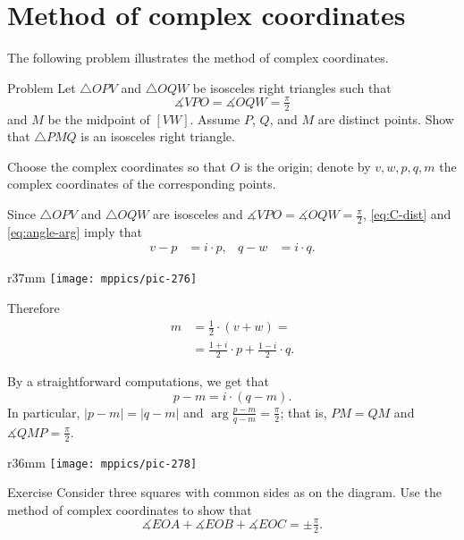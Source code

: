 \section*{Method of complex coordinates}

The following problem illustrates the method of complex coordinates.

\begin{thm}{Problem}\label{prob:2right-tringles}
Let $\triangle OPV$ and $\triangle OQW$ be isosceles right triangles such that 
\[\measuredangle VPO=\measuredangle OQW=\tfrac\pi2\] 
and $M$ be the midpoint of $[VW]$.
Assume $P$, $Q$, and $M$ are distinct points.
Show that  $\triangle PMQ$ is an isosceles right triangle.
\end{thm}

Choose the complex coordinates so that $O$ is the origin;
denote by $v, w, p, q, m$ the complex coordinates of the corresponding points.

Since $\triangle OPV$ and $\triangle OQW$ are isosceles and $\measuredangle VPO=\measuredangle OQW=\tfrac\pi2$,
\ref{eq:C-dist} and \ref{eq:angle-arg} imply that
\begin{align*}
v-p&=i\cdot p,
&
q-w&=i\cdot q.
\end{align*}

\begin{wrapfigure}{r}{37mm}
\centering
\texttt{[image: mppics/pic-276]}
\end{wrapfigure}

Therefore
\begin{align*}
m&=\tfrac12\cdot(v+w)=
\\
&=\tfrac{1+i}2\cdot p+\tfrac{1-i}2\cdot q.
\end{align*}

By a straightforward computations, we get that
\[p-m=i\cdot (q-m).\]
In particular, $|p-m|=|q-m|$ and  $\arg\frac{p-m}{q-m}=\tfrac\pi2$;
that is, $PM=QM$ and $\measuredangle QMP =\tfrac\pi2$.  
\qeds

{

\begin{wrapfigure}{r}{36mm}
\vskip-4mm
\centering
\texttt{[image: mppics/pic-278]}
\end{wrapfigure}

\begin{thm}{Exercise}\label{ex:3-squares}
Consider three squares with common sides as on the diagram.
Use the method of complex coordinates to show that 
\[\measuredangle EOA+\measuredangle EOB+\measuredangle EOC=\pm\tfrac\pi2.\]

\end{thm}

}

